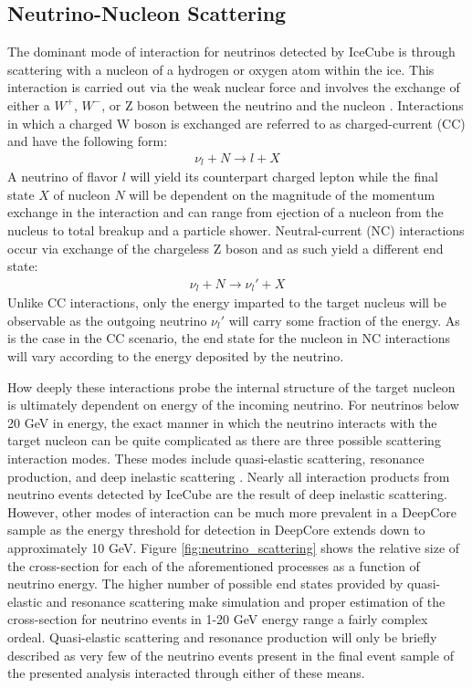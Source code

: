 \documentclass{gatech-thesis}
\begin{document}
\subsection{Neutrino-Nucleon Scattering}

The dominant mode of interaction for neutrinos detected by IceCube is through scattering with a nucleon of a hydrogen or oxygen atom within the ice. This interaction is carried out via the weak nuclear force and involves the exchange of either a $W^{+}$, $W^{-}$, or Z boson between the neutrino and the nucleon . Interactions in which a charged W boson is exchanged are referred to as charged-current (CC) and have the following form:
\begin{eqnarray}
\nu_{l} + N \rightarrow l + X
\end{eqnarray}
A neutrino of flavor $l$ will yield its counterpart charged lepton while the final state $X$ of nucleon $N$ will be dependent on the magnitude of the momentum exchange in the interaction and can range from ejection of a nucleon from the nucleus to total breakup and a particle shower. Neutral-current (NC) interactions occur via exchange of the chargeless Z boson and as such yield a different end state:
\begin{eqnarray}
\nu_{l} + N \rightarrow \nu_{l}' + X
\end{eqnarray}
Unlike CC interactions, only the energy imparted to the target nucleus will be observable as the outgoing neutrino $\nu_{l}'$ will carry some fraction of the energy. As is the case in the CC scenario, the end state for the nucleon in NC interactions will vary according to the energy deposited by the neutrino.

How deeply these interactions probe the internal structure of the target nucleon is ultimately dependent on energy of the incoming neutrino. For neutrinos below 20 GeV in energy, the exact manner in which the neutrino interacts with the target nucleon can be quite complicated as there are three possible scattering interaction modes. These modes include quasi-elastic scattering, resonance production, and deep inelastic scattering \cite{2012RvMP...84.1307F}. Nearly all interaction products from neutrino events detected by IceCube are the result of deep inelastic scattering. However, other modes of interaction can be much more prevalent in a DeepCore sample as the energy threshold for detection in DeepCore extends down to approximately 10 GeV. Figure \ref{fig:neutrino_scattering} shows the relative size of the cross-section for each of the aforementioned processes as a function of neutrino energy. The higher number of possible end states provided by quasi-elastic and resonance scattering make simulation and proper estimation of the cross-section for neutrino events in 1-20 GeV energy range a fairly complex ordeal. Quasi-elastic scattering and resonance production will only be briefly described as very few of the neutrino events present in the final event sample of the presented analysis interacted through either of these means.
\end{document}
